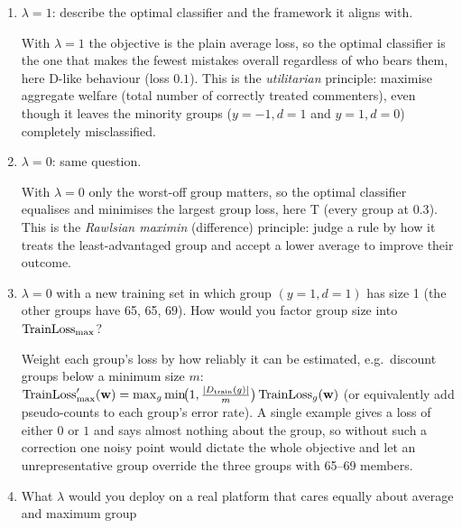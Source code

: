 \begin{enumerate}[label=(\roman*)]
  \item $\lambda=1$: describe the optimal classifier and the framework it aligns with. 
  \begin{solution}
  With $\lambda=1$ the objective is the plain average loss, so the optimal classifier is the one that makes
  the fewest mistakes overall regardless of who bears them, here D-like behaviour (loss $0.1$). This is the
  \emph{utilitarian} principle: maximise aggregate welfare (total number of correctly treated commenters), even
  though it leaves the minority groups ($y=-1,d=1$ and $y=1,d=0$) completely misclassified.
  \end{solution}
  \item $\lambda=0$: same question. 
  \begin{solution}
  With $\lambda=0$ only the worst-off group matters, so the optimal classifier equalises and minimises the
  largest group loss, here T (every group at $0.3$). This is the \emph{Rawlsian maximin} (difference)
  principle: judge a rule by how it treats the least-advantaged group and accept a lower average to improve
  their outcome.
  \end{solution}
  \item $\lambda=0$ with a new training set in which group $(y=1,d=1)$ has size 1 (the other groups have
        65, 65, 69). How would you factor group size into $\text{TrainLoss}_{\max}$? 
  \begin{solution}
  Weight each group's loss by how reliably it can be estimated, e.g.\ discount groups below a minimum size
  $m$:
  $\text{TrainLoss}_{\max}'(\mathbf{w})=\max_g \min\!\bigl(1,\tfrac{|D_{\text{train}}(g)|}{m}\bigr)\,\text{TrainLoss}_g(\mathbf{w})$
  (or equivalently add pseudo-counts to each group's error rate). A single example gives a loss of either
  $0$ or $1$ and says almost nothing about the group, so without such a correction one noisy point would
  dictate the whole objective and let an unrepresentative group override the three groups with 65--69 members.
  \end{solution}
  \item What $\lambda$ would you deploy on a real platform that cares equally about average and maximum group

\end{enumerate}
